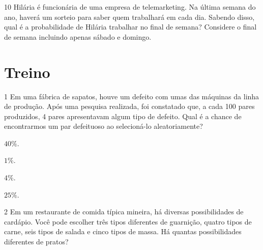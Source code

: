 \num{10} Hilária é funcionária de uma empresa de telemarketing. Na última
semana do ano, haverá um sorteio para saber quem trabalhará em cada dia.
Sabendo disso, qual é a probabilidade de Hilária trabalhar no final de
semana? Considere o final de semana incluindo apenas sábado e domingo.


\section*{Treino}

\num{1} Em uma fábrica de sapatos, houve um defeito com umas das máquinas da
linha de produção. Após uma pesquisa realizada, foi constatado que, a
cada 100 pares produzidos, 4 pares apresentavam algum tipo de defeito.
Qual é a chance de encontrarmos um par defeituoso ao selecioná-lo
aleatoriamente?

\begin{escolha}[itemsep=0pt]
\item $40\%$.
\item $1\%$.
\item $4\%$.
\item $25\%$.
\end{escolha}








\num{2} Em um restaurante de comida típica mineira, há diversas
possibilidades de cardápio. Você pode escolher três tipos diferentes de
guarnição, quatro tipos de carne, seis tipos de salada e cinco tipos de massa.
Há quantas possibilidades diferentes de pratos?

